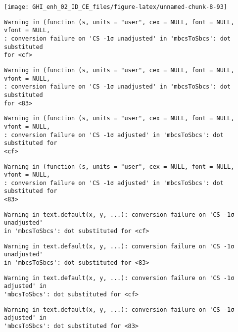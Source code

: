 \documentclass[
  10pt,
  a4paper,oneside]{article}
\begin{document}
\begin{center}\texttt{[image: GHI\_enh\_02\_ID\_CE\_files/figure-latex/unnamed-chunk-8-93]} \end{center}

\begin{verbatim}
Warning in (function (s, units = "user", cex = NULL, font = NULL, vfont = NULL,
: conversion failure on 'CS -1σ unadjusted' in 'mbcsToSbcs': dot substituted
for <cf>
\end{verbatim}

\begin{verbatim}
Warning in (function (s, units = "user", cex = NULL, font = NULL, vfont = NULL,
: conversion failure on 'CS -1σ unadjusted' in 'mbcsToSbcs': dot substituted
for <83>
\end{verbatim}

\begin{verbatim}
Warning in (function (s, units = "user", cex = NULL, font = NULL, vfont = NULL,
: conversion failure on 'CS -1σ adjusted' in 'mbcsToSbcs': dot substituted for
<cf>
\end{verbatim}

\begin{verbatim}
Warning in (function (s, units = "user", cex = NULL, font = NULL, vfont = NULL,
: conversion failure on 'CS -1σ adjusted' in 'mbcsToSbcs': dot substituted for
<83>
\end{verbatim}

\begin{verbatim}
Warning in text.default(x, y, ...): conversion failure on 'CS -1σ unadjusted'
in 'mbcsToSbcs': dot substituted for <cf>
\end{verbatim}

\begin{verbatim}
Warning in text.default(x, y, ...): conversion failure on 'CS -1σ unadjusted'
in 'mbcsToSbcs': dot substituted for <83>
\end{verbatim}

\begin{verbatim}
Warning in text.default(x, y, ...): conversion failure on 'CS -1σ adjusted' in
'mbcsToSbcs': dot substituted for <cf>
\end{verbatim}

\begin{verbatim}
Warning in text.default(x, y, ...): conversion failure on 'CS -1σ adjusted' in
'mbcsToSbcs': dot substituted for <83>
\end{verbatim}
\end{document}
